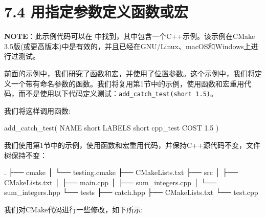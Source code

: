 \section{7.4 用指定参数定义函数或宏}

\begin{myInfoBox}
\textbf{NOTE}：此示例代码可以在  中找到，其中包含一个C++示例。该示例在CMake 3.5版(或更高版本)中是有效的，并且已经在GNU/Linux、macOS和Windows上进行过测试。
\end{myInfoBox}

前面的示例中，我们研究了函数和宏，并使用了位置参数。这个示例中，我们将定义一个带有命名参数的函数。我们将复用第1节中的示例，使用函数和宏重用代码，而不是使用以下代码定义测试：\texttt{add\_catch\_test(short 1.5)}。

我们将这样调用函数:

\begin{codebox}[cmake]
add_catch_test(
    NAME
    short
  LABELS
    short
    cpp_test
  COST
    1.5
  )
\end{codebox}


我们使用第1节中的示例，使用函数和宏重用代码，并保持C++源代码不变，文件树保持不变：

\begin{codebox}[shell]
.
├── cmake
│     └── testing.cmake
├── CMakeLists.txt
├── src
│     ├── CMakeLists.txt
│     ├── main.cpp
│     ├── sum_integers.cpp
│     └── sum_integers.hpp
└── tests
    ├── catch.hpp
    ├── CMakeLists.txt
    └── test.cpp
\end{codebox}


我们对CMake代码进行一些修改，如下所示:

